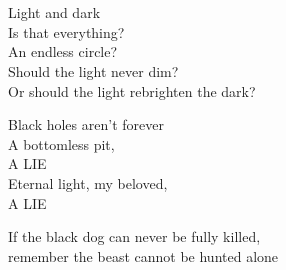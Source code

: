 \section*{}

\newlength{\poetrywidth}
\settowidth{\poetrywidth}{remember the beast cannot be hunted alone}

\vspace*{\fill}
\begin{center}
    \begin{minipage}{\poetrywidth}
        \raggedright

        Light and dark\\
        Is that everything?\\
        An endless circle?\\
        Should the light never dim?\\
        Or should the light rebrighten the dark?

        \vspace{\baselineskip}
        \vspace{\baselineskip}

        Black holes aren’t forever\\
        A bottomless pit,\\
        \hfill A LIE\\
        Eternal light, my beloved,\\
        \hfill A LIE

        \vspace{\baselineskip}
        \vspace{\baselineskip}

        If the black dog can never be fully killed,\\
        remember the beast cannot be hunted alone
    \end{minipage}
\end{center}
\vspace*{\fill}

